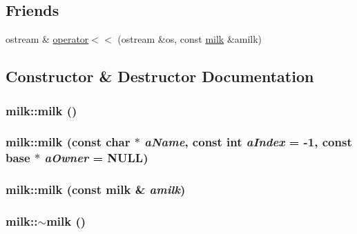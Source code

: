 \subsection*{Friends}
\begin{DoxyCompactItemize}
\item 
ostream \& \hyperlink{classmilk_adc53dfc2bbc4f8463e61ccb3c45f5ee0}{operator$<$$<$} (ostream \&os, const \hyperlink{classmilk}{milk} \&amilk)
\end{DoxyCompactItemize}


\subsection{Constructor \& Destructor Documentation}
\hypertarget{classmilk_afbca06d2ee59b992a121ac0df503c038}{
\subsubsection[{milk}]{\setlength{\rightskip}{0pt plus 5cm}milk::milk ()}}
\label{classmilk_afbca06d2ee59b992a121ac0df503c038}
\hypertarget{classmilk_a7d96f897491aa8ba5ba7440ef15501d3}{
\subsubsection[{milk}]{\setlength{\rightskip}{0pt plus 5cm}milk::milk (const char $\ast$ {\em aName}, \/  const int {\em aIndex} = {\ttfamily -\/1}, \/  const {\bf base} $\ast$ {\em aOwner} = {\ttfamily NULL})}}
\label{classmilk_a7d96f897491aa8ba5ba7440ef15501d3}
\hypertarget{classmilk_a32902c3e0b0e5c194bd605cca510ddc5}{
\subsubsection[{milk}]{\setlength{\rightskip}{0pt plus 5cm}milk::milk (const {\bf milk} \& {\em amilk})}}
\label{classmilk_a32902c3e0b0e5c194bd605cca510ddc5}
\hypertarget{classmilk_a1128ed2aee0dd59ea5ed3ed1c1433532}{
\subsubsection[{$\sim$milk}]{\setlength{\rightskip}{0pt plus 5cm}milk::$\sim$milk ()}}
\label{classmilk_a1128ed2aee0dd59ea5ed3ed1c1433532}


